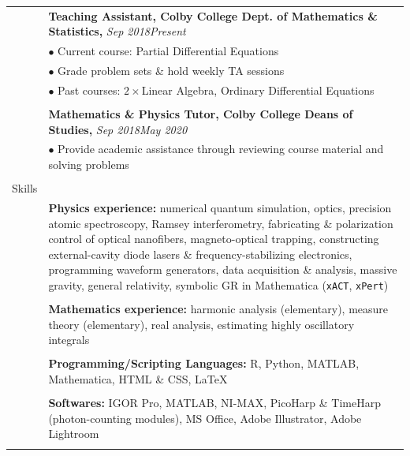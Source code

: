\documentclass[10pt]{article}
\begin{document}
\begin{longtable}{ l p{14.7cm}   }
     					& \textbf{Teaching Assistant, Colby College Dept. of Mathematics \& Statistics,}  \textit{Sep 2018\textendash Present} \\
     					& $\bullet$ Current course: Partial Differential Equations\\
     					& $\bullet$ Grade problem sets \& hold weekly TA sessions \\ %
     					& $\bullet$ Past courses: $2\times$Linear Algebra, Ordinary Differential Equations\\
     					& \\
     					 
     					& \textbf{Mathematics \& Physics Tutor, Colby College Deans of Studies,}  \textit{Sep 2018\textendash May 2020} \\
     					&  $\bullet$ Provide academic assistance through reviewing course material and solving problems \\
     					& \\
     					 
     					 
     					 
  
     				 	 
  
  
  						 
  						 
  \large{Skills}      	& \\ 
  						& \textbf{Physics experience:} numerical quantum simulation, optics, precision atomic spectroscopy, Ramsey interferometry, fabricating \& polarization control of optical nanofibers, magneto-optical trapping, constructing external-cavity diode lasers \& frequency-stabilizing electronics, programming  waveform generators, data acquisition \& analysis, massive gravity, general relativity, symbolic GR in Mathematica (\texttt{xACT}, \texttt{xPert})  \\ 
  						& \\
  						& \textbf{Mathematics experience:} harmonic analysis (elementary), measure theory (elementary), real analysis, estimating highly oscillatory integrals\\
  						& \\
  						& \textbf{Programming/Scripting Languages:} R, Python, MATLAB, Mathematica, HTML \& CSS, \LaTeX{}\\
  						& \\
  						& \textbf{Softwares:} IGOR Pro, MATLAB, NI-MAX, PicoHarp \& TimeHarp (photon-counting modules), MS Office,  Adobe Illustrator, Adobe Lightroom\\ 
  						& \\
  						 

\end{longtable}
\end{document}

